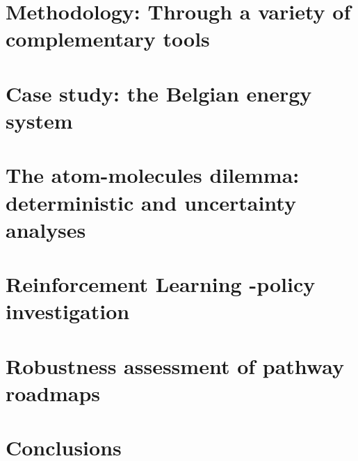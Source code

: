 \documentclass[a4paper,twoside,10pt,final]{memoir} %
\begin{document}
\chapter{Methodology: Through a variety of complementary tools}
\label{chap:chap_methodo}

\clearpage


\clearemptydoublepage
\chapter{Case study: the Belgian energy system} 
\label{chap:case_study}

\clearpage


\clearemptydoublepage
\chapter{The atom-molecules dilemma: deterministic and uncertainty analyses} 
\label{chap:atom_mol}

\clearpage

%
\clearemptydoublepage
\chapter{Reinforcement Learning -policy investigation}
\label{chap:chap_RL}

\clearpage

\clearemptydoublepage
\chapter{Robustness assessment of pathway roadmaps}
\label{chap:chap_RobPol}

\clearpage

\clearemptydoublepage
\chapter*[Conclusions]{Conclusions} 

\clearpage

\clearemptydoublepage

\end{document}
